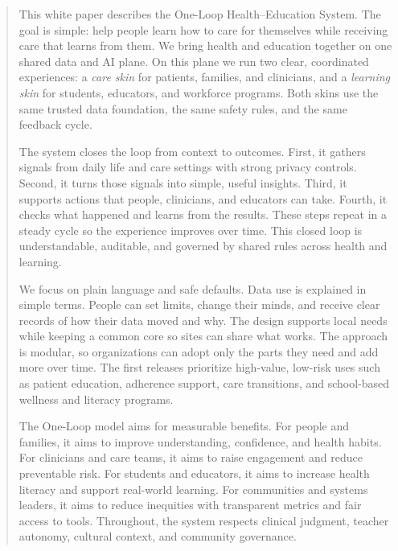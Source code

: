 \documentclass[12pt]{article}
\begin{document}
\begin{abstract}
This white paper describes the One-Loop Health–Education System. The goal is simple: help people learn how to care for themselves while receiving care that learns from them. We bring health and education together on one shared data and AI plane. On this plane we run two clear, coordinated experiences: a \emph{care skin} for patients, families, and clinicians, and a \emph{learning skin} for students, educators, and workforce programs. Both skins use the same trusted data foundation, the same safety rules, and the same feedback cycle.

The system closes the loop from context to outcomes. First, it gathers signals from daily life and care settings with strong privacy controls. Second, it turns those signals into simple, useful insights. Third, it supports actions that people, clinicians, and educators can take. Fourth, it checks what happened and learns from the results. These steps repeat in a steady cycle so the experience improves over time. This closed loop is understandable, auditable, and governed by shared rules across health and learning.

We focus on plain language and safe defaults. Data use is explained in simple terms. People can set limits, change their minds, and receive clear records of how their data moved and why. The design supports local needs while keeping a common core so sites can share what works. The approach is modular, so organizations can adopt only the parts they need and add more over time. The first releases prioritize high-value, low-risk uses such as patient education, adherence support, care transitions, and school-based wellness and literacy programs.

The One-Loop model aims for measurable benefits. For people and families, it aims to improve understanding, confidence, and health habits. For clinicians and care teams, it aims to raise engagement and reduce preventable risk. For students and educators, it aims to increase health literacy and support real-world learning. For communities and systems leaders, it aims to reduce inequities with transparent metrics and fair access to tools. Throughout, the system respects clinical judgment, teacher autonomy, cultural context, and community governance.
\end{abstract}


\newpage
 \begin{multicols}{2}
\begin{singlespace}
\tableofcontents
\end{singlespace}
\end{multicols}
\newpage
\end{document}
